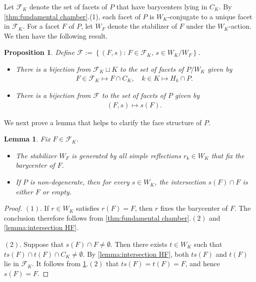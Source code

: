 \documentclass{amsart}
\theoremstyle{plain} \numberwithin{equation}{section}
\newtheorem{lemma}[theorem]{Lemma}
\newtheorem{proposition}[theorem]{Proposition}
\theoremstyle{definition}
\begin{document}
Let $\mathcal{F}_K$ denote the set of facets of $P$ that have barycenters lying in $C_K$. 
By \cref{thm:fundamental chamber}.(1), each facet of $P$ is $W_K$-conjugate to a unique facet in $\mathcal{F}_K$.
For a facet $F$ of $P$, let $W_F$ denote the stabilizer of $F$ under the $W_K$-action.
We then have the following result.

\begin{proposition}\label{prop:facets of polytopes}
  Define $\mathcal{F}:=\left\{(F,s):\, F\in\mathcal{F}_K,\, s\in{W_K}/{W_F}\right\}$.
  \begin{itemize}
    \item[$(1)$] There is a bijection from $\mathcal{F}_K\sqcup  K$ to the set of facets of $P/W_K$ given by 
     \begin{align*}
       F\in\mathcal{F}_K\mapsto F\cap C_K,\quad k\in K\mapsto H_k\cap P.
     \end{align*}
     \item[$(2)$] There is a bijection from $\mathcal{F}$ to the set of facets of $P$ given by 
     \begin{align*}
       (F,s)\mapsto s(F).
     \end{align*}
  \end{itemize}
\end{proposition}



We next prove a lemma that helps to clarify the face structure of $P$.


\begin{lemma}\label{lem:stabilizer}
  Fix $F\in\mathcal{F}_K$.
  \begin{itemize}
    \item[$(1)$] The stabilizer $W_F$ is generated by all  simple reflections $r_k\in W_K$ that fix the barycenter of $F$.
    \item[$(2)$] If $P$ is non-degenerate, then for every $s \in W_K$, the intersection $s(F) \cap F$ is either $F$ or empty.
  \end{itemize}
\end{lemma}
\begin{proof}
  $(1)$. If $r\in W_K$ satisfies $r(F)=F$, then $r$ fixes the barycenter of $F$. The conclusion therefore follows from \cref{thm:fundamental chamber}.$(2)$ and \cref{lemma:intersection HF}.


  $(2)$.  Suppose that $s(F) \cap F \neq \emptyset$. Then there exists  $t\in W_K$ such that $ts(F)\cap t(F)\cap C_K\ne\emptyset$. By \cref{lemma:intersection HF}, both $t s(F)$ and $t(F)$ lie in $\mathcal{F}_K$. 
It follows from \cref{prop:facets of polytopes}.$(2)$ that $ts(F)=t(F)=F$, and hence $s(F)=F$.
\qedhere
\end{proof}
\end{document}
